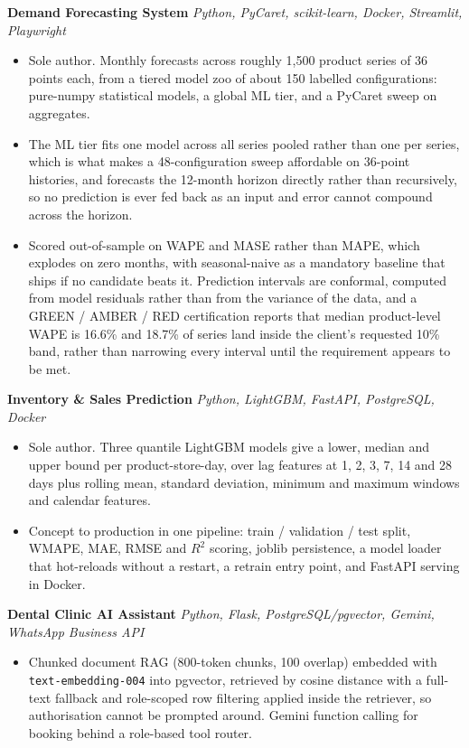 \documentclass[10pt,a4paper]{article}
\begin{document}
\textbf{Demand Forecasting System} \textit{Python, PyCaret, scikit-learn, Docker, Streamlit, Playwright}
\begin{itemize}
  \item Sole author. Monthly forecasts across roughly 1,500 product series of 36 points each, from a
        tiered model zoo of about 150 labelled configurations: pure-numpy statistical models, a
        global ML tier, and a PyCaret sweep on aggregates.
  \item The ML tier fits one model across all series pooled rather than one per series, which is
        what makes a 48-configuration sweep affordable on 36-point histories, and forecasts the
        12-month horizon directly rather than recursively, so no prediction is ever fed back as an
        input and error cannot compound across the horizon.
  \item Scored out-of-sample on WAPE and MASE rather than MAPE, which explodes on zero months, with
        seasonal-naive as a mandatory baseline that ships if no candidate beats it. Prediction
        intervals are conformal, computed from model residuals rather than from the variance of the
        data, and a GREEN / AMBER / RED certification reports that median product-level WAPE is
        16.6\% and 18.7\% of series land inside the client's requested 10\% band, rather than
        narrowing every interval until the requirement appears to be met.
\end{itemize}

\vspace{1pt}
\textbf{Inventory \& Sales Prediction} \textit{Python, LightGBM, FastAPI, PostgreSQL, Docker}
\begin{itemize}
  \item Sole author. Three quantile LightGBM models give a lower, median and upper bound per
        product-store-day, over lag features at 1, 2, 3, 7, 14 and 28 days plus rolling mean,
        standard deviation, minimum and maximum windows and calendar features.
  \item Concept to production in one pipeline: train / validation / test split, WMAPE, MAE, RMSE and
        $R^2$ scoring, joblib persistence, a model loader that hot-reloads without a restart, a
        retrain entry point, and FastAPI serving in Docker.
\end{itemize}

\vspace{1pt}
\textbf{Dental Clinic AI Assistant} \textit{Python, Flask, PostgreSQL/pgvector, Gemini, WhatsApp Business API}
\begin{itemize}
  \item Chunked document RAG (800-token chunks, 100 overlap) embedded with
        \texttt{text-embedding-004} into pgvector, retrieved by cosine distance with a full-text
        fallback and role-scoped row filtering applied inside the retriever, so authorisation cannot
        be prompted around. Gemini function calling for booking behind a role-based tool router.
\end{itemize}
\end{document}
